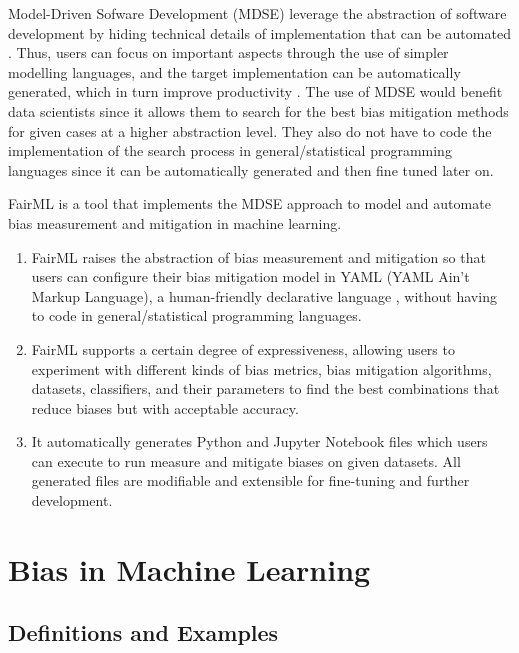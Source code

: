 \documentclass[sigconf,review]{acmart}
\begin{document}
Model-Driven Sofware Development (MDSE) leverage the abstraction of software development by hiding technical details of implementation that can be automated \cite{brambilla2017model}. Thus, users can focus on important aspects through the use of simpler modelling languages, and the target implementation can be automatically generated, which in turn improve productivity \cite{volter2013model}. The use of MDSE would benefit data scientists since it allows them to search for the best bias mitigation methods for given cases at a higher abstraction level. They also do not have to code the implementation of the search process in general/statistical programming languages since it can be automatically generated and then fine tuned later on. 

FairML is a tool that implements the MDSE approach to model and automate bias measurement and mitigation in machine learning. 
\begin{enumerate}
	\item FairML raises the abstraction of bias measurement and mitigation so that users can configure their bias mitigation model in YAML (YAML Ain’t Markup Language), a human-friendly declarative language \cite{evans2017yaml}, without having to code in general/statistical programming languages.
	\item FairML supports a certain degree of expressiveness, allowing users to experiment with different kinds of bias metrics, bias mitigation algorithms, datasets, classifiers, and their parameters to find the best combinations that reduce biases but with acceptable accuracy.
	\item It automatically generates Python and Jupyter Notebook files which users can execute to run measure and mitigate biases on given datasets. All generated files are modifiable and extensible for fine-tuning and further development.
\end{enumerate}



\section{Bias in Machine Learning}
\label{sec:bias_in_machine_learning}

\subsection{Definitions and Examples}
\label{sec:definitions_and_examples}
\end{document}
